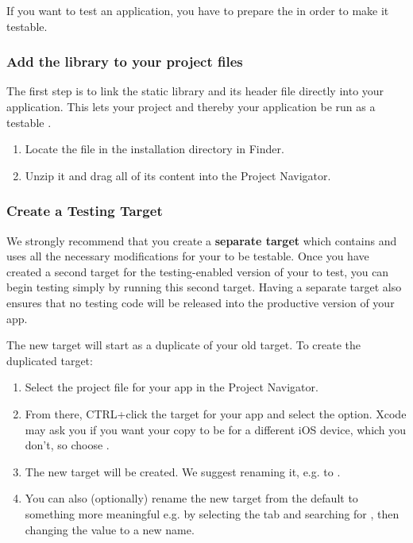 
If you want to test an  application, you have to prepare the \gdaut{} in order to make it testable. 


\subsubsection{Add the library to your project files}

The first step is to link the  static library and its header file directly 
into your  application. This lets your project and thereby your  application be run as a testable \gdaut{}. 

\begin{enumerate}
\item Locate the  file in the installation directory in Finder.
\item Unzip it and drag all of its content into the Project Navigator.
\end{enumerate}

\subsubsection{Create a Testing Target}

We strongly recommend that you create a \textbf{separate target} which contains and uses all the necessary modifications for your \gdaut{} to be testable. 
Once you have created a second target for the testing-enabled version of your \gdaut{} to test, you can begin testing simply by running this second target. Having a separate target also ensures that no testing code will be released into the productive version of your app. 

The new target will start as a duplicate of your old target. To create the duplicated target:
\begin{enumerate}
\item Select the project file for your app in the Project Navigator.
\item From there, CTRL+click the target for your app and select the  option. Xcode may ask you if you want your copy to be for a different iOS device, which you don't, so choose . 
\item The new target will be created. We suggest renaming it, e.g. to  .
\item You can  also (optionally) rename the new target from the default  to something more meaningful e.g.   
by selecting the  tab and searching for , then changing the value to a new name.
\end{enumerate}


